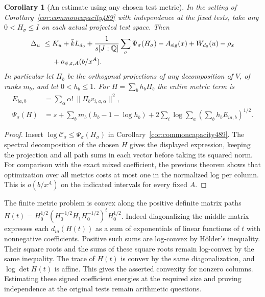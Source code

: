 \documentclass[a4paper,11pt]{article}
\newtheorem{corollary}[proposition]{Corollary}
\theoremstyle{definition}
\theoremstyle{remark}
\numberwithin{equation}{section}
\begin{document}
\begin{corollary}[An estimate using any chosen test metric]\leavevmode
\label{cor:orthometric491}
In the setting of Corollary~\ref{cor:commoncapacity489} with
independence at the fixed tests, take any \(0<H_\sigma\le I\)
on each actual projected test space. Then
\[
 \begin{aligned}
 \Delta_u\ \le{}&K_u+\bar k L_{d_0}
      +{1\over s[J:\mathbb Q]}\sum_\sigma\Psi_\sigma(H_\sigma)
      -A_{\rm sig}(x)+W_{d_0}(u)-\rho_x\\
      &+o_{\psi,\varepsilon,A}(b/x^A).
 \end{aligned}
\]
In particular let \(\Pi_b\) be the orthogonal projections of any
decomposition of \(V\), of ranks \(m_b\), and let \(0<h_b\le1\).
For \(H=\sum_b h_b\Pi_b\) the entire metric term is
\[
 \begin{aligned}
 E_{ia,b}&=\sum_\alpha\alpha!\,\|\Pi_bv_{i,a,\alpha}\|^2,\\
 \Psi_\sigma(H)&=s+\sum_b m_b(h_b-1-\log h_b)
          +2\sum_i\log\sum_a \left(\sum_b h_b E_{ia,b}\right)^{1/2}.
 \end{aligned}
\]
\end{corollary}
\begin{proof}
Insert \(\log\mathcal C_\sigma\le\Psi_\sigma(H_\sigma)\) in
Corollary~\ref{cor:commoncapacity489}. The spectral decomposition
of the chosen \(H\) gives the displayed expression, keeping the
projection and all path sums in each vector before taking its
squared norm. For comparison with the exact mixed coefficient,
the previous theorem shows that optimization over all metrics
costs at most one in the normalized log per column. This is
\(o(b/x^A)\) on the indicated intervals for every fixed \(A\).
\end{proof}

The finite metric problem is convex along the positive definite
matrix paths \(H(t)=H_0^{1/2}(H_0^{-1/2}H_1H_0^{-1/2})^tH_0^{1/2}\).
Indeed diagonalizing the middle matrix expresses each \(d_{ia}(H(t))\)
as a sum of exponentials of linear functions of \(t\) with nonnegative
coefficients. Positive such sums are log-convex by H\"older's inequality.
Their square roots and the sums of these square roots remain log-convex
by the same inequality. The trace of \(H(t)\) is convex by the
same diagonalization, and \(\log\det H(t)\) is affine.
This gives the asserted convexity for nonzero columns. Estimating
these signed coefficient energies at the required size and proving
independence at the original tests remain arithmetic questions.
\end{document}
